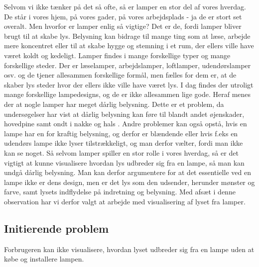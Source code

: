 Selvom vi ikke tænker på det så ofte, så er lamper en stor del af vores hverdag. De står i vores hjem, på vores gader, på vores arbejdsplads - ja de er stort set overalt. Men hvorfor er lamper enlig så vigtige? Det er de, fordi lamper bliver brugt til at skabe lys. Belysning kan bidrage til mange ting som at læse, arbejde mere koncentret eller til at skabe hygge og stemning i et rum, der ellers ville have været koldt og kedeligt. Lamper findes i mange forskellige typer og mange forskellige steder. Der er læselamper, arbejdslamper, loftlamper, udendørslamper osv. og de tjener allesammen forskellige formål, men fælles for dem er, at de skaber lys steder hvor der ellers ikke ville have været lys. 
I dag findes der utroligt mange forskellige lampedesigns, og de er ikke allesammen lige gode. Heraf menes der at nogle lamper har meget dårlig belysning. Dette er et problem, da undersøgelser har vist at dårlig belysning kan føre til blandt andet øjenskader, hovedpine samt ondt i nakke og hals \cite{lys_konsekvenser}. Andre problemer kan også opstå, hvis en lampe har en for kraftig belysning, og derfor er blændende eller hvis f.eks en udendørs lampe ikke lyser tilstrækkeligt, og man derfor vælter, fordi man ikke kan se noget. 
Så selvom lamper spiller en stor rolle i vores hverdag, så er det vigtigt at kunne visualisere hvordan lys udbreder sig fra en lampe, så man kan undgå dårlig belysning. 
Man kan derfor argumentere for at det essentielle ved en lampe ikke er dens design, men er det lys som den udsender, herunder mønster og farve, samt lysets indflydelse på indretning og belysning. Med afsæt i denne observation har vi derfor valgt at arbejde med visualisering af lyset fra lamper.

\subsection{Initierende problem}

Forbrugeren kan ikke visualisere, hvordan lyset udbreder sig fra en lampe uden at købe og installere lampen.